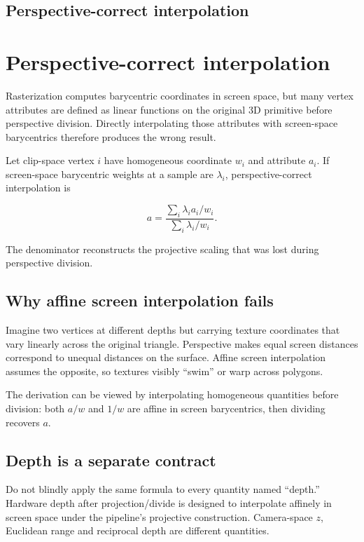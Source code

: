 \hypertarget{appendix-1ed5f96c73ea}{}
\section*{Perspective-correct interpolation}
\chapter{Perspective-correct interpolation}\label{appendix-1ed5f96c73ea-perspective-correct-interpolation}

Rasterization computes barycentric coordinates in screen space, but many vertex attributes are defined as linear functions on the original 3D primitive before perspective division. Directly interpolating those attributes with screen-space barycentrics therefore produces the wrong result.

Let clip-space vertex \(i\) have homogeneous coordinate \(w_i\) and attribute \(a_i\). If screen-space barycentric weights at a sample are \(\lambda_i\), perspective-correct interpolation is

\[
a=
\frac{
\sum_i \lambda_i a_i/w_i
}{
\sum_i \lambda_i /w_i
}.
\]

The denominator reconstructs the projective scaling that was lost during perspective division.

\section{Why affine screen interpolation fails}\label{appendix-1ed5f96c73ea-why-affine-screen-interpolation-fails}

Imagine two vertices at different depths but carrying texture coordinates that vary linearly across the original triangle. Perspective makes equal screen distances correspond to unequal distances on the surface. Affine screen interpolation assumes the opposite, so textures visibly ``swim'' or warp across polygons.

The derivation can be viewed by interpolating homogeneous quantities before division: both \(a/w\) and \(1/w\) are affine in screen barycentrics, then dividing recovers \(a\).

\section{Depth is a separate contract}\label{appendix-1ed5f96c73ea-depth-is-a-separate-contract}

Do not blindly apply the same formula to every quantity named ``depth.'' Hardware depth after projection/divide is designed to interpolate affinely in screen space under the pipeline's projective construction. Camera-space \(z\), Euclidean range and reciprocal depth are different quantities.

